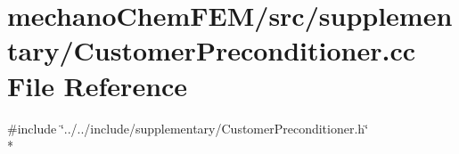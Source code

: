 \section{mechano\-Chem\-F\-E\-M/src/supplementary/\-Customer\-Preconditioner.cc File Reference}
\label{_customer_preconditioner_8cc}
{\ttfamily \#include \char`\"{}../../include/supplementary/\-Customer\-Preconditioner.\-h\char`\"{}}\\*
